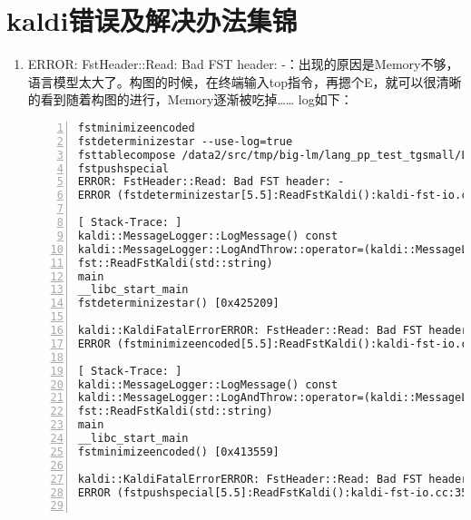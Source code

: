 \section{kaldi错误及解决办法集锦}
\begin{enumerate}
  \item ERROR: FstHeader::Read: Bad FST header: -：出现的原因是Memory不够，语言模型太大了。构图的时候，在终端输入top指令，再摁个E，就可以很清晰的看到随着构图的进行，Memory逐渐被吃掉……
  log如下：
  \begin{lstlisting}[language=shell, numbers=left, 
         numberstyle=\tiny,keywordstyle=\color{blue!70},
         commentstyle=\color{red!50!green!50!blue!50},frame=shadowbox,
         rulesepcolor=\color{red!20!green!20!blue!20},basicstyle=\ttfamily]
fstminimizeencoded 
fstdeterminizestar --use-log=true 
fsttablecompose /data2/src/tmp/big-lm/lang_pp_test_tgsmall/L_disambig.fst /data2/src/tmp/big-lm/lang_pp_test_tgsmall/G.fst 
fstpushspecial 
ERROR: FstHeader::Read: Bad FST header: -
ERROR (fstdeterminizestar[5.5]:ReadFstKaldi():kaldi-fst-io.cc:35) Reading FST: error reading FST header from standard input

[ Stack-Trace: ]
kaldi::MessageLogger::LogMessage() const
kaldi::MessageLogger::LogAndThrow::operator=(kaldi::MessageLogger const&)
fst::ReadFstKaldi(std::string)
main
__libc_start_main
fstdeterminizestar() [0x425209]

kaldi::KaldiFatalErrorERROR: FstHeader::Read: Bad FST header: -
ERROR (fstminimizeencoded[5.5]:ReadFstKaldi():kaldi-fst-io.cc:35) Reading FST: error reading FST header from standard input

[ Stack-Trace: ]
kaldi::MessageLogger::LogMessage() const
kaldi::MessageLogger::LogAndThrow::operator=(kaldi::MessageLogger const&)
fst::ReadFstKaldi(std::string)
main
__libc_start_main
fstminimizeencoded() [0x413559]

kaldi::KaldiFatalErrorERROR: FstHeader::Read: Bad FST header: -
ERROR (fstpushspecial[5.5]:ReadFstKaldi():kaldi-fst-io.cc:35) Reading FST: error reading FST header from standard input


\end{lstlisting}
\end{enumerate}
